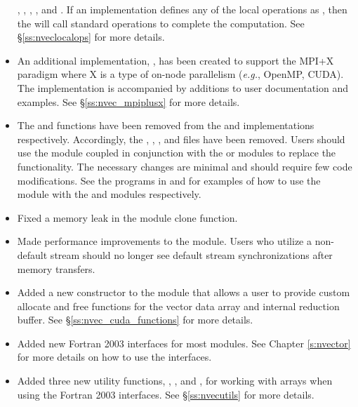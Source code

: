 \begin{itemize}
,
,
,
, and
.
If an {\nvector} implementation defines any of the local operations as
, then the {\nvecmpimanyvector} will call standard {\nvector}
operations to complete the computation. See \S\ref{ss:nveclocalops} for more
details.
%
\item An additional {\nvector} implementation, {\nvecmpiplusx}, has been created to
support the MPI+X paradigm where X is a type of on-node parallelism
(\textit{e.g.}, OpenMP, CUDA). The implementation is accompanied by additions to
user documentation and {\sundials} examples. See \S\ref{ss:nvec_mpiplusx} for
more details.
%
\item The  and  functions have been removed from the
{\nveccuda} and {\nvecraja} implementations respectively. Accordingly, the
, \newline\noindent
{},
, and 
files have been removed. Users should use the {\nvecmpiplusx} module coupled
in conjunction with the {\nveccuda} or {\nvecraja} modules to replace the
functionality. The necessary changes are minimal and should require few
code modifications. See the programs in  and
 for examples of how to use the {\nvecmpiplusx}
module with the {\nveccuda} and {\nvecraja} modules respectively.
%
\item Fixed a memory leak in the {\nvecpetsc} module clone function.
%
\item Made performance improvements to the {\nveccuda} module. Users who utilize a
non-default stream should no longer see default stream synchronizations
after memory transfers.
%
\item Added a new constructor to the {\nveccuda} module that allows a user to provide
custom allocate and free functions for the vector data array and internal
reduction buffer. See \S\ref{ss:nvec_cuda_functions} for more details.
%
\item Added new Fortran 2003 interfaces for most {\nvector} modules. See Chapter
\ref{s:nvector} for more details on how to use the interfaces.
%
\item Added three new {\nvector} utility functions,
,\newline\noindent
{}, and
,
for working with  arrays when using the Fortran 2003 interfaces.
See \S\ref{ss:nvecutils} for more details.
\end{itemize}

